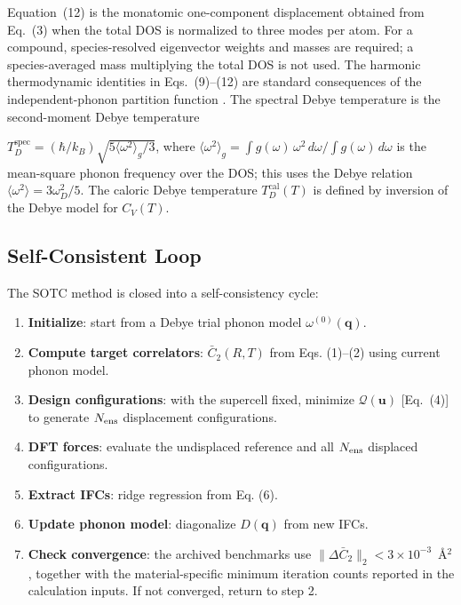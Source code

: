 \documentclass[aps,prb,reprint,amsmath,amssymb,floatfix]{revtex4-2}
\providecommand{\tightlist}{\setlength{\itemsep}{0pt}\setlength{\parskip}{0pt}}
\begin{document}
\color{revisionblue}
Equation~(12) is the monatomic one-component displacement obtained from
Eq.~(3) when the total DOS is normalized to three modes per atom. For a
compound, species-resolved eigenvector weights and masses are required; a
species-averaged mass multiplying the total DOS is not used. The harmonic
thermodynamic identities in Eqs.~(9)--(12) are standard consequences of the
independent-phonon partition function \cite{ref13}.
The spectral Debye temperature is the second-moment Debye temperature
\color{black}

\color{revisionblue}
\(T_D^\text{spec} = (\hbar/k_B)\sqrt{5\langle\omega^2\rangle_g/3}\),
where
\(\langle\omega^2\rangle_g = \int g(\omega)\,\omega^2\,d\omega/\int g(\omega)\,d\omega\)
is the mean-square phonon frequency over the DOS; this uses the Debye
relation \(\langle\omega^2\rangle = 3\omega_D^2/5\). The caloric Debye
temperature \(T_D^\text{cal}(T)\) is defined by inversion of the Debye
model for \(C_V(T)\).
\color{black}

\subsection{Self-Consistent Loop}\label{self-consistent-loop}

The SOTC method is closed into a self-consistency cycle:

\color{revisionblue}
\begin{enumerate}
\def\labelenumi{\arabic{enumi}.}
\tightlist
\item
  \textbf{Initialize}: start from a Debye trial phonon model
  \(\omega^{(0)}(\mathbf{q})\).
\item
  \textbf{Compute target correlators}: \(\bar{C}_2(R,T)\) from Eqs.
  (1)--(2) using current phonon model.
\item
  \textbf{Design configurations}: with the supercell fixed,
  minimize \(\mathcal Q(\mathbf u)\) [Eq.~(4)] to generate
  \(N_{\rm ens}\) displacement configurations.
\item
  \textbf{DFT forces}: evaluate the undisplaced reference
  and all \(N_{\rm ens}\) displaced configurations.
\item
  \textbf{Extract IFCs}: ridge regression from Eq. (6).
\item
  \textbf{Update phonon model}: diagonalize \(D(\mathbf{q})\) from new
  IFCs.
\item
  \textbf{Check convergence}: the archived benchmarks use
  \(\|\Delta\bar C_2\|_2<3\times10^{-3}\)~Å\(^2\), together with the
  material-specific minimum iteration counts reported in the calculation
  inputs. If not converged, return to step 2.
\end{enumerate}
\color{black}
\end{document}
